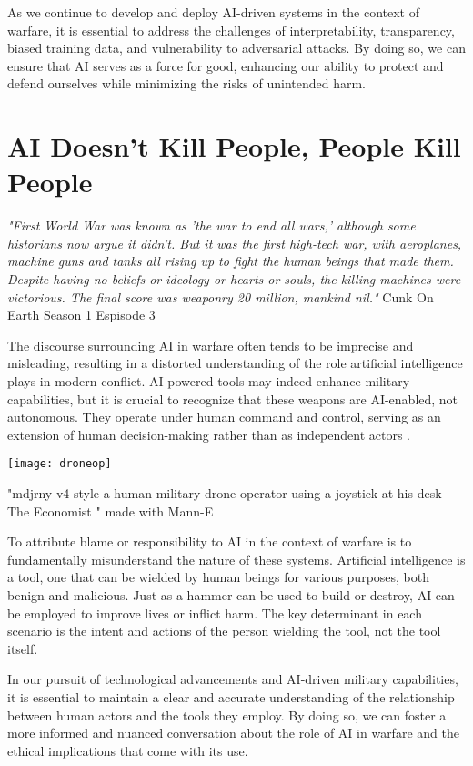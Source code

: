 As we continue to develop and deploy AI-driven systems in the context of warfare, it is essential to address the challenges of interpretability, transparency, biased training data, and vulnerability to adversarial attacks. By doing so, we can ensure that AI serves as a force for good, enhancing our ability to protect and defend ourselves while minimizing the risks of unintended harm.

\section{AI Doesn't Kill People, People Kill People}

\textit{"First World War was known as 'the war to end all wars,' although some historians now argue it didn't. But it was the first high-tech war, with aeroplanes, machine guns and tanks all rising up to fight the human beings that made them. Despite having no beliefs or ideology or hearts or souls, the killing machines were victorious. The final score was weaponry 20 million, mankind nil."} Cunk On Earth Season 1 Espisode 3 \cite{cunkonearth}

The discourse surrounding AI in warfare often tends to be imprecise and misleading, resulting in a distorted understanding of the role artificial intelligence plays in modern conflict. AI-powered tools may indeed enhance military capabilities, but it is crucial to recognize that these weapons are AI-enabled, not autonomous. They operate under human command and control, serving as an extension of human decision-making rather than as independent actors \cite{aiwarfare}.

\begin{marginfigure}[-5.5cm]
        \texttt{[image: droneop]}
        \caption{"mdjrny-v4 style a human military drone operator using a joystick at his desk The Economist " made with Mann-E}
\end{marginfigure}

To attribute blame or responsibility to AI in the context of warfare is to fundamentally misunderstand the nature of these systems. Artificial intelligence is a tool, one that can be wielded by human beings for various purposes, both benign and malicious. Just as a hammer can be used to build or destroy, AI can be employed to improve lives or inflict harm. The key determinant in each scenario is the intent and actions of the person wielding the tool, not the tool itself.

In our pursuit of technological advancements and AI-driven military capabilities, it is essential to maintain a clear and accurate understanding of the relationship between human actors and the tools they employ. By doing so, we can foster a more informed and nuanced conversation about the role of AI in warfare and the ethical implications that come with its use.

